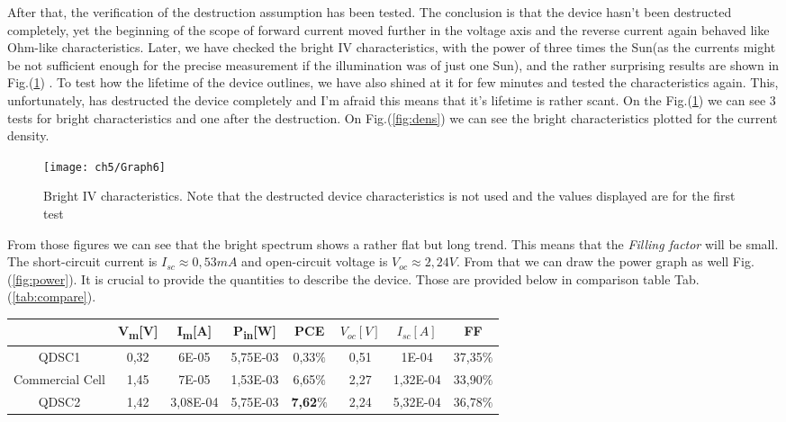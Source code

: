 {After that, the verification of the destruction assumption has been tested. The conclusion is that the device hasn't been destructed completely, yet the beginning of the scope of forward current moved further in the voltage axis and the reverse current again behaved like Ohm-like characteristics. Later, we have checked the bright IV characteristics, with the power of three times the Sun(as the currents might be not sufficient enough for the precise measurement if the illumination was of just one Sun), and the rather surprising results are shown in Fig.(\ref{fig:bright}) . To test how the lifetime of the device outlines, we have also shined at it for few minutes and tested the characteristics again. This, unfortunately, has destructed the device completely and I'm afraid this means that it's lifetime is rather scant. On the Fig.(\ref{fig:bright}) we can see 3 tests for bright characteristics and one after the destruction. On Fig.(\ref{fig:dens}) we can see the bright characteristics plotted for the current density. 

\begin{figure}
\centering
\texttt{[image: ch5/Graph6]}
\caption{Bright IV characteristics. Note that the destructed device characteristics is not used and the values displayed are for the first test}
\label{fig:bright}
\end{figure}

From those figures we can see that the bright spectrum shows a rather flat but long trend. This means that the \textit{Filling factor} will be small. The short-circuit current is $I_{sc} \approx 0,53mA$ and open-circuit voltage is $V_{oc} \approx 2,24V$. From that we can draw the power graph as well Fig.(\ref{fig:power}). It is crucial to provide the quantities to describe the device. Those are provided below in comparison table Tab.(\ref{tab:compare}).

\begin{table}[t]
\centering
\begin{tabular}{|c |c |c | c | c| c | c | c |}
\hline
& V\textsubscript{m}{[}V{]} & I\textsubscript{m}{[}A{]} &P\textsubscript{in}{[}W{]} & PCE & $V_{oc}[V]$ & $I_{sc}[A]$ & FF\\
\hline
QDSC1 & 0,32 & 6E-05 & 5,75E-03 & 0,33$\%$ & 0,51&1E-04&37,35$\%$\\
\hline
Commercial Cell & 1,45 & 7E-05 & 1,53E-03 & 6,65$\%$ & 2,27 & 1,32E-04 &33,90$\%$\\
\hline
QDSC2 & 1,42 & 3,08E-04 & 5,75E-03 & \textbf{7,62$\%$} & 2,24 & 5,32E-04 &36,78$\%$\\
\hline


\end{tabular}
\end{table}}
